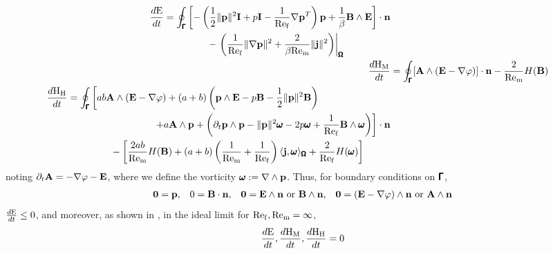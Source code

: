     \begin{align}
        \begin{split}
            \frac{d\mathrm{E}}{dt}  &=  \oint_{\pmb{\mathsf{\Gamma}}}\left[- \left(\frac{1}{2}\|\mathbf{p}\|^{2}\mathbf{I} + p\mathbf{I} - \frac{1}{\mathrm{Re}_{\mathrm{f}}}\nabla\mathbf{p}^{T}\right)\mathbf{p} + \frac{1}{\beta}\mathbf{B}\wedge\mathbf{E}\right]\cdot\mathbf{n}  \\
            &\;\;\;\;\;\;\;\;\;\;\;\;\;\;\;\;- \left.\left(\frac{1}{\mathrm{Re}_{\mathrm{f}}}\|\nabla\mathbf{p}\|^{2} + \frac{2}{\beta\mathrm{Re}_{\mathrm{m}}}\|\mathbf{j}\|^{2}\right)\right|_{\pmb{\mathsf{\Omega}}}
        \end{split}  \\
        \frac{d\mathrm{H}_{\mathrm{M}}}{dt}  &=  \oint_{\pmb{\mathsf{\Gamma}}}[\mathbf{A}\wedge(\mathbf{E} - \nabla\varphi)]\cdot\mathbf{n} - \frac{2}{\mathrm{Re}_{\mathrm{m}}}H(\mathbf{B})  \\
        \begin{split}
            \frac{d\mathrm{H}_{\mathrm{H}}}{dt}  &=  \oint_{\pmb{\mathsf{\Gamma}}}\left[ab\mathbf{A}\wedge(\mathbf{E} - \nabla\varphi) + (a + b)\left(\mathbf{p}\wedge\mathbf{E} - p\mathbf{B} - \frac{1}{2}\|\mathbf{p}\|^{2}\mathbf{B}\right)\right.  \\
            &\;\;\;\;\;\;\;\;\;\;\;\;\;\;\;\;\;\;\;\;\;\;\;\;\;\;\;\;\;\;\;\;\left.+ a\mathbf{A}\wedge\mathbf{p} + \left(\partial_{t}\mathbf{p}\wedge\mathbf{p} - \|\mathbf{p}\|^{2}\pmb{\mathsf{\omega}} - 2p\pmb{\mathsf{\omega}} + \frac{1}{\mathrm{Re}_{\mathrm{f}}}\mathbf{B}\wedge\pmb{\mathsf{\omega}}\right)\right]\cdot\mathbf{n}  \\
            &\;\;\;\;\;\;\;\;\;\;\;\;\;\;\;\;- \left[\frac{2ab}{\mathrm{Re}_{\mathrm{m}}}H(\mathbf{B}) + (a + b)\left(\frac{1}{\mathrm{Re}_{\mathrm{m}}} + \frac{1}{\mathrm{Re}_{\mathrm{f}}}\right)\langle\mathbf{j}, \pmb{\mathsf{\omega}}\rangle_{\pmb{\mathsf{\Omega}}} + \frac{2}{\mathrm{Re}_{\mathrm{f}}}H(\pmb{\mathsf{\omega}})\right]
        \end{split}
    \end{align}
    noting $\partial_{t}\mathbf{A}  =  - \nabla\varphi - \mathbf{E}$, where we define the vorticity $\pmb{\mathsf{\omega}}  :=  \nabla\wedge\mathbf{p}$. Thus, for boundary conditions on $\pmb{\mathsf{\Gamma}}$, 
    \begin{align}
        \mathbf{0}  =  \mathbf{p},  &&
        0  =  \mathbf{B}\cdot\mathbf{n},  &&
        \mathbf{0}  =  \mathbf{E}\wedge\mathbf{n} \text{ or } \mathbf{B}\wedge\mathbf{n},  &&
        \mathbf{0}  =  (\mathbf{E} - \nabla\varphi)\wedge\mathbf{n} \text{ or } \mathbf{A}\wedge\mathbf{n}
    \end{align}
    $\frac{d\mathrm{E}}{dt}  \leq  0$, and moreover, as shown in \cite{LHF22}, in the ideal limit for $\mathrm{Re}_{\mathrm{f}}, \mathrm{Re}_{\mathrm{m}}  =  \infty$,
    \begin{equation}
        \frac{d\mathrm{E}}{dt}, \frac{d\mathrm{H}_{\mathrm{M}}}{dt}, \frac{d\mathrm{H}_{\mathrm{H}}}{dt}  =  0
    \end{equation}


